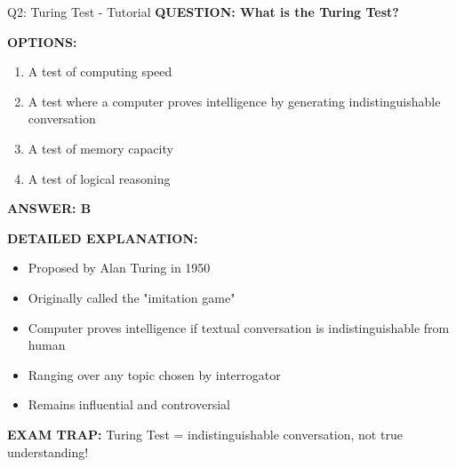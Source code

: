 \documentclass[8pt]{beamer}
\begin{document}
	\begin{frame}{Q2: Turing Test - Tutorial}
		\fontsize{6.5}{7.5}\selectfont
		\textbf{QUESTION: What is the Turing Test?}
		
		\vspace{0.1cm}
		\textbf{OPTIONS:}
		\begin{enumerate}
			\item A test of computing speed
			\item A test where a computer proves intelligence by generating indistinguishable conversation
			\item A test of memory capacity
			\item A test of logical reasoning
		\end{enumerate}
		
		\vspace{0.1cm}
		\textcolor{myblue}{\textbf{ANSWER: B}}
		
		\vspace{0.1cm}
		\textbf{DETAILED EXPLANATION:}
		\begin{itemize}
			\item Proposed by Alan Turing in 1950
			\item Originally called the "imitation game"
			\item Computer proves intelligence if textual conversation is indistinguishable from human
			\item Ranging over any topic chosen by interrogator
			\item Remains influential and controversial
		\end{itemize}
		
		\vspace{0.1cm}
		\textcolor{myred}{\textbf{EXAM TRAP:}} Turing Test = \textcolor{myblue}{indistinguishable conversation}, not true understanding!
	\end{frame}
	
\end{document}
